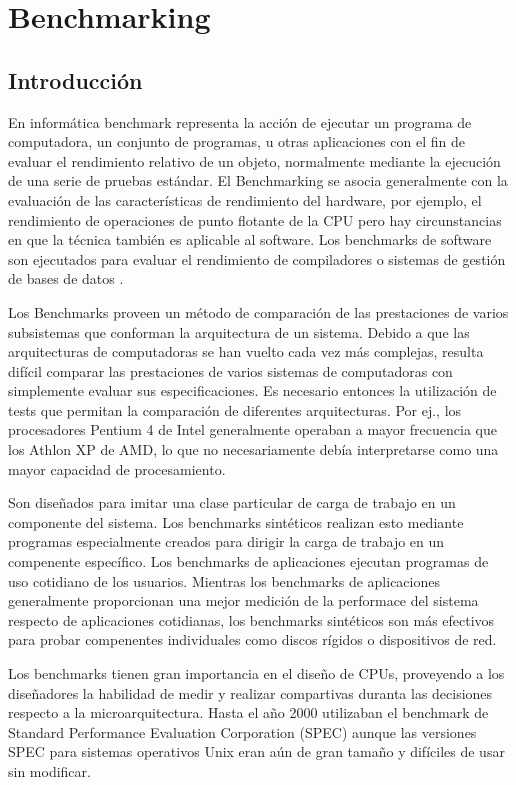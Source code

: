 \chapter{Benchmarking}
	\section{Introducción}
	En informática benchmark representa la acción de ejecutar un programa de computadora, un conjunto de programas, u otras aplicaciones con el fin
	de evaluar el rendimiento relativo de un objeto, normalmente mediante la ejecución de una serie de pruebas estándar.  El Benchmarking se asocia
	generalmente con la evaluación de las características de rendimiento del hardware, por ejemplo, el rendimiento de operaciones de punto flotante de la
	CPU pero hay circunstancias en que la técnica también es aplicable al software. Los benchmarks de software son ejecutados para evaluar el
	rendimiento de compiladores o sistemas de gestión de bases de datos .
	
	Los Benchmarks proveen un método de comparación de las prestaciones de varios subsistemas que conforman la arquitectura de un sistema. Debido a que
	las arquitecturas de computadoras se han vuelto cada vez más complejas, resulta difícil comparar las prestaciones de varios sistemas de computadoras
	con simplemente evaluar sus especificaciones. Es necesario entonces la utilización de tests que permitan la comparación de diferentes arquitecturas.
	Por ej., los procesadores Pentium 4 de Intel generalmente operaban a mayor frecuencia que los Athlon XP de AMD, lo que no necesariamente debía
	interpretarse como una mayor capacidad de procesamiento.
	
	Son diseñados para imitar una clase particular de carga de trabajo en un componente del sistema. Los benchmarks sintéticos realizan esto mediante
	programas especialmente creados para dirigir la carga de trabajo en un compenente específico. Los benchmarks de aplicaciones ejecutan programas
	de uso cotidiano de los usuarios. Mientras los benchmarks de aplicaciones generalmente proporcionan una mejor medición de la performace del sistema
	respecto de aplicaciones cotidianas, los benchmarks sintéticos son más efectivos para probar compenentes individuales como discos rígidos o
	dispositivos de red.

	Los benchmarks tienen gran importancia en el diseño de CPUs, proveyendo a los diseñadores la habilidad de medir y realizar compartivas duranta las
	decisiones respecto a la microarquitectura. Hasta el año 2000 utilizaban el benchmark de Standard Performance Evaluation Corporation (SPEC) aunque
	las versiones SPEC para sistemas operativos Unix eran aún de gran tamaño y difíciles de usar sin modificar.
	
